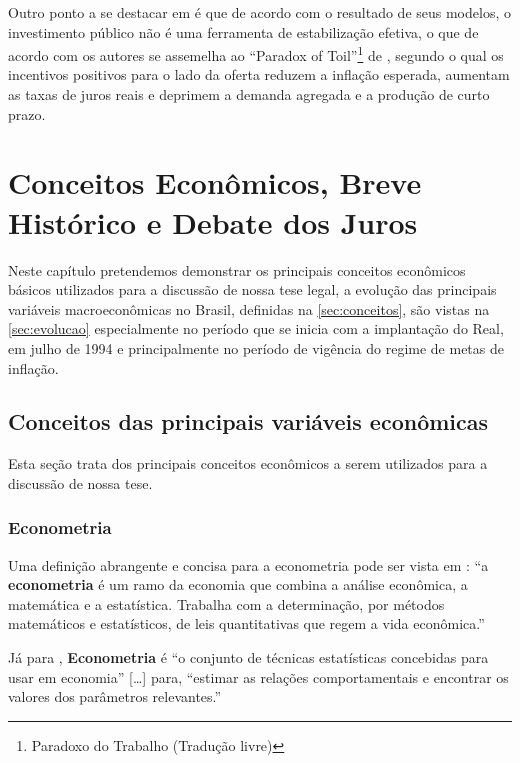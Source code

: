 \documentclass[
	10pt,				%
	openright,			%
	twoside,			%
	a5paper,			%
	english,			%
	french,				%
	spanish,			%
	brazil				%
	]{abntex2}
\begin{document}
Outro ponto a se destacar em  é que de
acordo com o resultado de seus modelos, o investimento público não é uma
ferramenta de estabilização efetiva, o que de acordo com os autores se
assemelha ao ``Paradox of Toil''\footnote{Paradoxo do Trabalho (Tradução
  livre)} de , segundo o qual
os incentivos positivos para o lado da oferta reduzem a inflação
esperada, aumentam as taxas de juros reais e deprimem a demanda agregada
e a produção de curto prazo.

\chapter{Conceitos Econômicos, Breve Histórico e Debate dos
Juros}\label{conceitos-econuxf4micos-breve-histuxf3rico-e-debate-dos-juros}

Neste capítulo pretendemos demonstrar os principais conceitos econômicos
básicos utilizados para a discussão de nossa tese legal, a evolução das
principais variáveis macroeconômicas no Brasil, definidas na
\autoref{sec:conceitos}, são vistas na \autoref{sec:evolucao}
especialmente no período que se inicia com a implantação do Real, em
julho de 1994 e principalmente no período de vigência do regime de metas
de inflação.

\section{Conceitos das principais variáveis
econômicas}\label{sec:conceitos}

Esta seção trata dos principais conceitos econômicos a serem utilizados
para a discussão de nossa tese.

\subsection{Econometria}\label{econometria}

Uma definição abrangente e concisa para a econometria pode ser vista em
\cite[p.~36]{rossetti}: ``a \textbf{econometria} é um ramo da economia
que combina a análise econômica, a matemática e a estatística. Trabalha
com a determinação, por métodos matemáticos e estatísticos, de leis
quantitativas que regem a vida econômica.''

Já para , \textbf{Econometria} é ``o
conjunto de técnicas estatísticas concebidas para usar em economia''
\cite[p.~567]{blanchard}{[}\ldots{}{]} para, ``estimar as relações
comportamentais e encontrar os valores dos parâmetros relevantes.''
\end{document}
